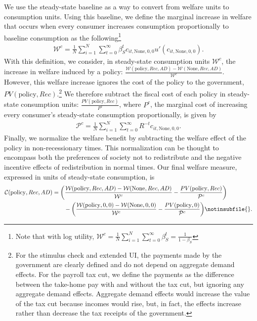 \documentclass[\econtexRoot/HAFiscal]{subfiles}
\begin{document}
We use the steady-state baseline as a way to convert from welfare units to consumption units. Using this baseline, we define the marginal increase in welfare that occurs when every consumer increases consumption proportionally to baseline consumption as the following\footnote{Note that with log utility, $\mathcal{W}^c =\frac{1}{N}\sum_{i=1}^{N} \sum_{t=0}^{\infty} \beta_S^t = \frac{1}{1-\beta_S}$}
\begin{align}
  \mathcal{W}^c =\frac{1}{N}\sum_{i=1}^{N} \sum_{t=0}^{\infty} \beta_S^t c_{it,\text{None},0,0} u'(c_{it,\text{None},0,0}) .
\end{align}
With this definition, we consider, in steady-state consumption units $\mathcal{W}^c$, the increase in welfare induced by a policy: $\frac{\mathcal{W}(\text{policy},Rec,AD)-\mathcal{W}(\text{None},Rec,AD)}{\mathcal{W}^c}$. However, this welfare increase ignores the cost of the policy to the government, $PV(\text{policy},Rec)$.\footnote{For the stimulus check and extended UI, the payments made by the government are clearly defined and do not depend on aggregate demand effects. For the payroll tax cut, we define the payments as the difference between the take-home pay with and without the tax cut, but ignoring any aggregate demand effects. Aggregate demand effects would increase the value of the tax cut because incomes would rise, but, in fact, the effects increase rather than decrease the tax receipts of the government.} We therefore subtract the fiscal cost of each policy in steady-state consumption units:  $\frac{PV(\text{policy},Rec)}{{P}^c}$, where ${P}^c$, the marginal cost of increasing every consumer's steady-state consumption proportionally, is given by
\begin{align}
  \mathcal{P}^c = \frac{1}{N}\sum_{i=1}^{N} \sum_{t=0}^{\infty} R^{-t} c_{it,\text{None},0,0} .
\end{align}
Finally, we normalize the welfare benefit by subtracting the welfare effect of the policy in non-recessionary times. This normalization can be thought to encompass both the preferences of society not to redistribute and the negative incentive effects of redistribution in normal times. Our final welfare measure, expressed in units of steady-state consumption, is
\begin{align}
  \mathcal{C}(\text{policy},Rec,AD) &= \bigg(\frac{\mathcal{W}(\text{policy},Rec,AD)-\mathcal{W}(\text{None},Rec,AD)}{\mathcal{W}^c} - \frac{PV(\text{policy},Rec)}{\mathcal{P}^c} \bigg) \nonumber \\  
                                    & \qquad -
                                      \bigg(\frac{\mathcal{W}(\text{policy},0,0) - \mathcal{W}(\text{None},0,0)}{\mathcal{W}^c} - \frac{PV(\text{policy},0)}{\mathcal{P}^c} \bigg) \notinsubfile{\label{welfare_defn}}.
\end{align}
\end{document}
